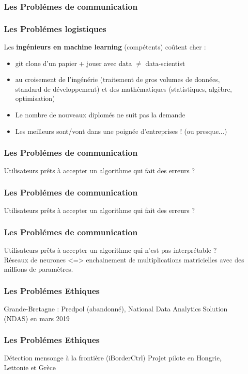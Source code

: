 \begin{frame}
\frametitle{Les Problémes de communication}
\end{frame}

\begin{frame}
  \frametitle{Les Problémes logistiques}
  Les \textbf{ingénieurs en machine learning} (compétents) coûtent cher :
  \begin{itemize}
  \item git clone d'un papier + jouer avec data $\neq$ data-scientist
  \item au croisement de l'ingénérie (traitement de gros volumes de données, standard de développement) et des mathématiques (statistiques, algèbre, optimisation)
  \item Le nombre de nouveaux diplomés ne suit pas la demande
  \item Les meilleurs sont/vont dans une poignée d'entreprises ! (ou presque...)
  \end{itemize}
\end{frame}

\begin{frame}
  \frametitle{Les Problémes de communication}
  Utilisateurs prêts à accepter un algorithme qui fait des erreurs ?
\end{frame}

\begin{frame}
  \frametitle{Les Problémes de communication}
  Utilisateurs prêts à accepter un algorithme qui fait des erreurs ?
\end{frame}

\begin{frame}
  \frametitle{Les Problémes de communication}
  Utilisateurs prêts à accepter un algorithme qui n'est pas interprétable ?\\
  Réseaux de neurones <=> enchainement de multiplications matricielles avec des millions de paramètres.
\end{frame}

\begin{frame}
  \frametitle{Les Problémes Ethiques}
  Grande-Bretagne : Predpol (abandonné),  National Data Analytics Solution (NDAS) en mars 2019
\end{frame}

\begin{frame}
  \frametitle{Les Problémes Ethiques}
  Détection mensonge à la frontière (iBorderCtrl)
  \newline
  Projet pilote en Hongrie, Lettonie et Grèce
\end{frame}

